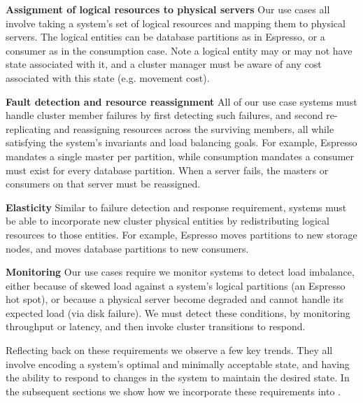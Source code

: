 \squishlist
\item \textbf{Assignment of logical resources to physical servers}
Our use cases all involve taking a system's set of logical resources and mapping
them to physical servers.  The logical entities can be database partitions as in
Espresso, or a consumer as in the \databus consumption case.  Note a logical
entity may or may not have state associated with it, and a cluster manager must
be aware of any cost associated with this state (e.g. movement cost).
\item \textbf{Fault detection and resource reassignment}
All of our use case systems must handle cluster member failures by first
detecting such failures, and second re-replicating and reassigning resources 
across the surviving members, all while satisfying the system's invariants and 
load balancing goals.  For example, Espresso mandates a single master per
partition, while \databus consumption mandates a consumer must exist for every
database partition.  When a server fails, the masters or consumers on that
server must be reassigned. 
\item \textbf{Elasticity} 
Similar to failure detection and response requirement, systems must be able to
incorporate new cluster physical entities by redistributing logical resources
to those entities.  For example, Espresso moves partitions to new storage nodes,
and \databus moves database partitions to new consumers.  
\item \textbf{Monitoring}
Our use cases require we monitor systems to detect load imbalance, either
because of skewed load against a system's logical partitions (\eg an Espresso
hot spot), or because a physical server become degraded and cannot
handle its expected load (\eg via disk failure).  We must detect these
conditions, \eg by monitoring throughput or latency, and then invoke cluster
transitions to respond.
\squishend
 
Reflecting back on these requirements we observe a few key trends.  They all
involve encoding a system's optimal and minimally acceptable state, and having the ability
to respond to changes in the system to maintain the desired state.  In the
subsequent sections we show how we incorporate these requirements into \helix. 



